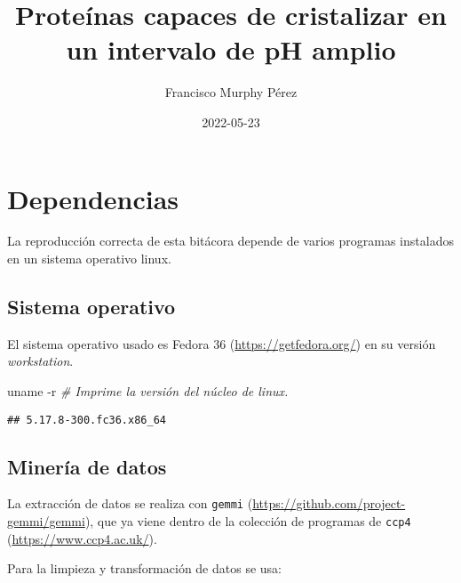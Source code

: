 \documentclass[
]{book}
\title{Proteínas capaces de cristalizar en un intervalo de pH amplio}
\author{Francisco Murphy Pérez}
\date{2022-05-23}
\newenvironment{Shaded}{\begin{snugshade}}{\end{snugshade}}
\newcommand{\AttributeTok}[1]{\textcolor[rgb]{0.77,0.63,0.00}{#1}}
\newcommand{\CommentTok}[1]{\textcolor[rgb]{0.56,0.35,0.01}{\textit{#1}}}
\newcommand{\FunctionTok}[1]{\textcolor[rgb]{0.00,0.00,0.00}{#1}}
\theoremstyle{definition}
\theoremstyle{definition}
\theoremstyle{definition}
\theoremstyle{definition}
\theoremstyle{remark}
\begin{document}
\maketitle

{
\setcounter{tocdepth}{1}
\tableofcontents
}
\begin{Shaded}
\end{Shaded}

\hypertarget{dependencias}{%
\chapter{Dependencias}\label{dependencias}}

La reproducción correcta de esta bitácora depende de varios programas instalados en un sistema operativo linux.

\hypertarget{sistema-operativo}{%
\section{Sistema operativo}\label{sistema-operativo}}

El sistema operativo usado es Fedora 36 (\url{https://getfedora.org/}) en su versión \emph{workstation}.

\begin{Shaded}
\begin{Highlighting}[]
\FunctionTok{uname} \AttributeTok{{-}r} \CommentTok{\# Imprime la versión del núcleo de linux.}
\end{Highlighting}
\end{Shaded}

\begin{verbatim}
## 5.17.8-300.fc36.x86_64
\end{verbatim}

\hypertarget{mineruxeda-de-datos}{%
\section{Minería de datos}\label{mineruxeda-de-datos}}

La extracción de datos se realiza con \texttt{gemmi} (\url{https://github.com/project-gemmi/gemmi}), que ya viene dentro de la colección de programas de \texttt{ccp4} (\url{https://www.ccp4.ac.uk/}).

Para la limpieza y transformación de datos se usa:
\end{document}
